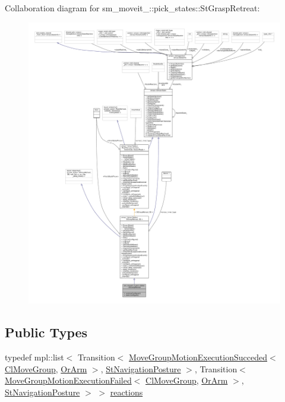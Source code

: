 Collaboration diagram for sm\+\_\+moveit\+\_\+:\+:pick\+\_\+states\+:\+:St\+Grasp\+Retreat\+:
\nopagebreak
\begin{figure}[H]
\begin{center}
\leavevmode
\includegraphics[width=350pt]{structsm__moveit__2_1_1pick__states_1_1StGraspRetreat__coll__graph}
\end{center}
\end{figure}
\subsection*{Public Types}
\begin{DoxyCompactItemize}
\item 
typedef mpl\+::list$<$ Transition$<$ \hyperlink{structmoveit__z__client_1_1MoveGroupMotionExecutionSucceded}{Move\+Group\+Motion\+Execution\+Succeded}$<$ \hyperlink{classmoveit__z__client_1_1ClMoveGroup}{Cl\+Move\+Group}, \hyperlink{classsm__moveit__2_1_1OrArm}{Or\+Arm} $>$, \hyperlink{structsm__moveit__2_1_1pick__states_1_1StNavigationPosture}{St\+Navigation\+Posture} $>$, Transition$<$ \hyperlink{structmoveit__z__client_1_1MoveGroupMotionExecutionFailed}{Move\+Group\+Motion\+Execution\+Failed}$<$ \hyperlink{classmoveit__z__client_1_1ClMoveGroup}{Cl\+Move\+Group}, \hyperlink{classsm__moveit__2_1_1OrArm}{Or\+Arm} $>$, \hyperlink{structsm__moveit__2_1_1pick__states_1_1StNavigationPosture}{St\+Navigation\+Posture} $>$ $>$ \hyperlink{structsm__moveit__2_1_1pick__states_1_1StGraspRetreat_ab997f1dc2e3bf3a1a5d554d997f49e36}{reactions}
\end{DoxyCompactItemize}
